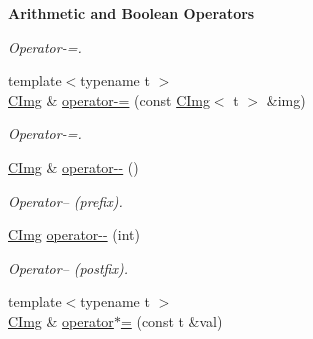 \begin{Indent}{\bf Arithmetic and Boolean Operators}
\begin{DoxyCompactItemize}
\begin{DoxyCompactList}\small\item\em Operator-\/=. \end{DoxyCompactList}\item 
\hypertarget{structcimg__library_1_1_c_img_a7010f2825c11db5ac97670a56b7ad112}{{\footnotesize template$<$typename t $>$ }\\\hyperlink{structcimg__library_1_1_c_img}{C\-Img} \& \hyperlink{structcimg__library_1_1_c_img_a7010f2825c11db5ac97670a56b7ad112}{operator-\/=} (const \hyperlink{structcimg__library_1_1_c_img}{C\-Img}$<$ t $>$ \&img)}\label{structcimg__library_1_1_c_img_a7010f2825c11db5ac97670a56b7ad112}

\begin{DoxyCompactList}\small\item\em Operator-\/=. \end{DoxyCompactList}\item 
\hypertarget{structcimg__library_1_1_c_img_a312219826827d9125d3a06a9d78121bc}{\hyperlink{structcimg__library_1_1_c_img}{C\-Img} \& \hyperlink{structcimg__library_1_1_c_img_a312219826827d9125d3a06a9d78121bc}{operator-\/-\/} ()}\label{structcimg__library_1_1_c_img_a312219826827d9125d3a06a9d78121bc}

\begin{DoxyCompactList}\small\item\em Operator-- (prefix). \end{DoxyCompactList}\item 
\hypertarget{structcimg__library_1_1_c_img_a816c15f4cadf7f8605623c6eb367a3f9}{\hyperlink{structcimg__library_1_1_c_img}{C\-Img} \hyperlink{structcimg__library_1_1_c_img_a816c15f4cadf7f8605623c6eb367a3f9}{operator-\/-\/} (int)}\label{structcimg__library_1_1_c_img_a816c15f4cadf7f8605623c6eb367a3f9}

\begin{DoxyCompactList}\small\item\em Operator-- (postfix). \end{DoxyCompactList}\item 
\hypertarget{structcimg__library_1_1_c_img_ab6d571f7831c2c049ccc428865833212}{{\footnotesize template$<$typename t $>$ }\\\hyperlink{structcimg__library_1_1_c_img}{C\-Img} \& \hyperlink{structcimg__library_1_1_c_img_ab6d571f7831c2c049ccc428865833212}{operator$\ast$=} (const t \&val)}\label{structcimg__library_1_1_c_img_ab6d571f7831c2c049ccc428865833212}


\end{DoxyCompactItemize}
\end{Indent}
